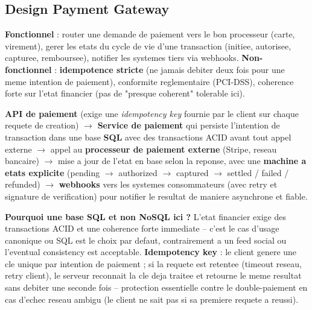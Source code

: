 \documentclass[11pt,a4paper]{article}
\newenvironment{sujet}[1]{%
  \subsection{#1}
}{%
  \bigskip
}
\begin{document}
\begin{sujet}{Design Payment Gateway}

\begin{req}
\textbf{Fonctionnel} : router une demande de paiement vers le bon processeur (carte, virement), gerer les etats du cycle de vie d'une transaction (initiee, autorisee, capturee, remboursee), notifier les systemes tiers via webhooks. \textbf{Non-fonctionnel} : \textbf{idempotence stricte} (ne jamais debiter deux fois pour une meme intention de paiement), conformite reglementaire (PCI-DSS), coherence forte sur l'etat financier (pas de "presque coherent" tolerable ici).
\end{req}

\begin{archbox}
\textbf{API de paiement} (exige une \emph{idempotency key} fournie par le client sur chaque requete de creation) $\to$ \textbf{Service de paiement} qui persiste l'intention de transaction dans une base \textbf{SQL} avec des transactions ACID avant tout appel externe $\to$ appel au \textbf{processeur de paiement externe} (Stripe, reseau bancaire) $\to$ mise a jour de l'etat en base selon la reponse, avec une \textbf{machine a etats explicite} (pending $\to$ authorized $\to$ captured $\to$ settled / failed / refunded) $\to$ \textbf{webhooks} vers les systemes consommateurs (avec retry et signature de verification) pour notifier le resultat de maniere asynchrone et fiable.
\end{archbox}

\begin{tradeoff}
\textbf{Pourquoi une base SQL et non NoSQL ici ?} L'etat financier exige des transactions ACID et une coherence forte immediate -- c'est le cas d'usage canonique ou SQL est le choix par defaut, contrairement a un feed social ou l'eventual consistency est acceptable. \textbf{Idempotency key} : le client genere une cle unique par intention de paiement ; si la requete est retentee (timeout reseau, retry client), le serveur reconnait la cle deja traitee et retourne le meme resultat sans debiter une seconde fois -- protection essentielle contre le double-paiement en cas d'echec reseau ambigu (le client ne sait pas si sa premiere requete a reussi).
\end{tradeoff}

\end{sujet}
\end{document}
